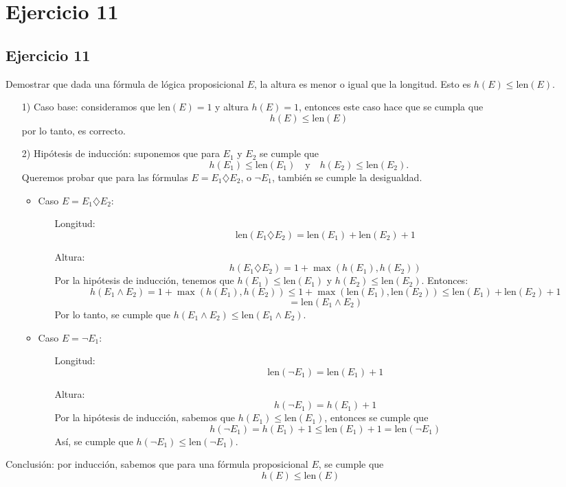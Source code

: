 \chapter*{Ejercicio 11}
\section*{Ejercicio 11}

Demostrar que dada una fórmula de lógica proposicional $E$, la altura es menor o igual que la longitud. Esto es $h(E) \leq \text{len}(E)$. \\

\begin{enumerate}
    \item[1)] Caso base: consideramos que $\text{len}(E) = 1$ y altura $h(E) = 1$, entonces este caso hace que se cumpla que
    \[
    h(E) \leq \text{len}(E)
    \]
    por lo tanto, es correcto.

    \item[2)] Hipótesis de inducción: suponemos que para $E_1$ y $E_2$ se cumple que
    \[
    h(E_1) \leq \text{len}(E_1) \quad \text{y} \quad h(E_2) \leq \text{len}(E_2).
    \]
    Queremos probar que para las fórmulas $E = E_1  \diamondsuit E_2$, o $\neg E_1$, también se cumple la desigualdad.

    \begin{itemize}
        \item Caso $E = E_1 \diamondsuit E_2$:
        \begin{itemize}
            \item[]  Longitud:
            \[
            \text{len}(E_1 \diamondsuit E_2) = \text{len}(E_1) + \text{len}(E_2) + 1
            \]
            \item[] Altura:
            \[
            h(E_1 \diamondsuit E_2) = 1 + \max(h(E_1), h(E_2))
            \]
            Por la hipótesis de inducción, tenemos que $h(E_1) \leq \text{len}(E_1)$ y $h(E_2) \leq \text{len}(E_2)$. Entonces:
            \[
            h(E_1 \land E_2) = 1 + \max(h(E_1), h(E_2)) \leq 1 + \max(\text{len}(E_1), \text{len}(E_2)) \leq \text{len}(E_1) + \text{len}(E_2) + 1
            \]
            \[
            = \text{len}(E_1 \land E_2)
            \]
            Por lo tanto, se cumple que $h(E_1 \land E_2) \leq \text{len}(E_1 \land E_2)$.
        \end{itemize}
        \item Caso $E = \neg E_1$:
        \begin{itemize}
            \item []Longitud:
            \[
            \text{len}(\neg E_1) = \text{len}(E_1) + 1
            \]
            \item[] Altura:
            \[
            h(\neg E_1) = h(E_1) + 1
            \]
            Por la hipótesis de inducción, sabemos que $h(E_1) \leq \text{len}(E_1)$, entonces se cumple que
            \[
            h(\neg E_1) = h(E_1) + 1 \leq \text{len}(E_1) + 1 = \text{len}(\neg E_1)
            \]
            Así, se cumple que $h(\neg E_1) \leq \text{len}(\neg E_1)$.
        \end{itemize}
    \end{itemize}
\end{enumerate}

Conclusión: por inducción, sabemos que para una fórmula proposicional $E$, se cumple que
\[
h(E) \leq \text{len}(E)
\]